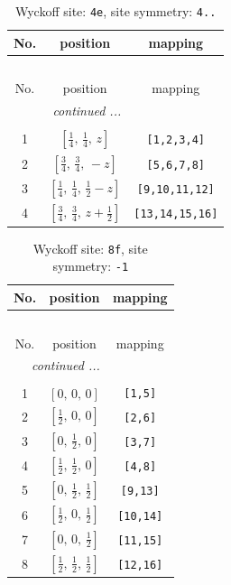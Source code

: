 \documentclass[fleqn,8pt]{jsarticle}
\begin{document}
\renewcommand{\arraystretch}{1.2}
\begin{longtable}{ccc}
\caption{Wyckoff site: {\tt 4e}, site symmetry: {\tt 4..}}
 \\
 \hline \hline
No. & position & mapping \\ \hline \endfirsthead

\multicolumn{2}{l}{\tablename\ \thetable{}} \\
 \hline \hline
No. & position & mapping \\ \hline \endhead

 \hline \hline
\multicolumn{2}{r}{\footnotesize\it continued ...} \\ \endfoot

 \hline \hline
\multicolumn{2}{r}{} \\ \endlastfoot

1 & $\left[ \frac{1}{4},\, \frac{1}{4},\, z \right]$ & {\tt [1,2,3,4]} \\ \hline
2 & $\left[ \frac{3}{4},\, \frac{3}{4},\, - z \right]$ & {\tt [5,6,7,8]} \\ \hline
3 & $\left[ \frac{1}{4},\, \frac{1}{4},\, \frac{1}{2} - z \right]$ & {\tt [9,10,11,12]} \\ \hline
4 & $\left[ \frac{3}{4},\, \frac{3}{4},\, z + \frac{1}{2} \right]$ & {\tt [13,14,15,16]} \\
\end{longtable}
\renewcommand{\arraystretch}{1.2}
\begin{longtable}{ccc}
\caption{Wyckoff site: {\tt 8f}, site symmetry: {\tt -1}}
 \\
 \hline \hline
No. & position & mapping \\ \hline \endfirsthead

\multicolumn{2}{l}{\tablename\ \thetable{}} \\
 \hline \hline
No. & position & mapping \\ \hline \endhead

 \hline \hline
\multicolumn{2}{r}{\footnotesize\it continued ...} \\ \endfoot

 \hline \hline
\multicolumn{2}{r}{} \\ \endlastfoot

1 & $\left[ 0,\, 0,\, 0 \right]$ & {\tt [1,5]} \\ \hline
2 & $\left[ \frac{1}{2},\, 0,\, 0 \right]$ & {\tt [2,6]} \\ \hline
3 & $\left[ 0,\, \frac{1}{2},\, 0 \right]$ & {\tt [3,7]} \\ \hline
4 & $\left[ \frac{1}{2},\, \frac{1}{2},\, 0 \right]$ & {\tt [4,8]} \\ \hline
5 & $\left[ 0,\, \frac{1}{2},\, \frac{1}{2} \right]$ & {\tt [9,13]} \\ \hline
6 & $\left[ \frac{1}{2},\, 0,\, \frac{1}{2} \right]$ & {\tt [10,14]} \\ \hline
7 & $\left[ 0,\, 0,\, \frac{1}{2} \right]$ & {\tt [11,15]} \\ \hline
8 & $\left[ \frac{1}{2},\, \frac{1}{2},\, \frac{1}{2} \right]$ & {\tt [12,16]} \\
\end{longtable}
\end{document}

